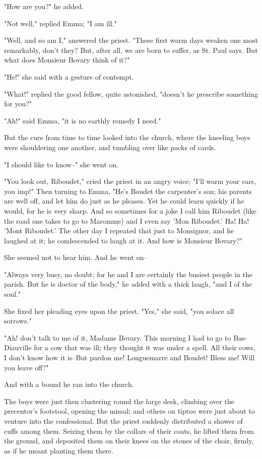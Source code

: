 \documentclass{tufte-book}
\begin{document}
"How are you?" he added.

"Not well," replied Emma; "I am ill."

"Well, and so am I," answered the priest. "These first warm days weaken
one most remarkably, don't they? But, after all, we are born to suffer,
as St. Paul says. But what does Monsieur Bovary think of it?"

"He!" she said with a gesture of contempt.

"What!" replied the good fellow, quite astonished, "doesn't he prescribe
something for you?"

"Ah!" said Emma, "it is no earthly remedy I need."

But the cure from time to time looked into the church, where the
kneeling boys were shouldering one another, and tumbling over like packs
of cards.

"I should like to know--" she went on.

"You look out, Riboudet," cried the priest in an angry voice; "I'll warm
your ears, you imp!" Then turning to Emma, "He's Boudet the carpenter's
son; his parents are well off, and let him do just as he pleases. Yet he
could learn quickly if he would, for he is very sharp. And so sometimes
for a joke I call him Riboudet (like the road one takes to go to
Maromme) and I even say 'Mon Riboudet.' Ha! Ha! 'Mont Riboudet.' The
other day I repeated that just to Monsignor, and he laughed at it; he
condescended to laugh at it. And how is Monsieur Bovary?"

She seemed not to hear him. And he went on--

"Always very busy, no doubt; for he and I are certainly the busiest
people in the parish. But he is doctor of the body," he added with a
thick laugh, "and I of the soul."

She fixed her pleading eyes upon the priest. "Yes," she said, "you
solace all sorrows."

"Ah! don't talk to me of it, Madame Bovary. This morning I had to go to
Bas-Diauville for a cow that was ill; they thought it was under a spell.
All their cows, I don't know how it is--But pardon me! Longuemarre and
Boudet! Bless me! Will you leave off?"

And with a bound he ran into the church.

The boys were just then clustering round the large desk, climbing over
the precentor's footstool, opening the missal; and others on tiptoe were
just about to venture into the confessional. But the priest suddenly
distributed a shower of cuffs among them. Seizing them by the collars of
their coats, he lifted them from the ground, and deposited them on their
knees on the stones of the choir, firmly, as if he meant planting them
there.
\end{document}
